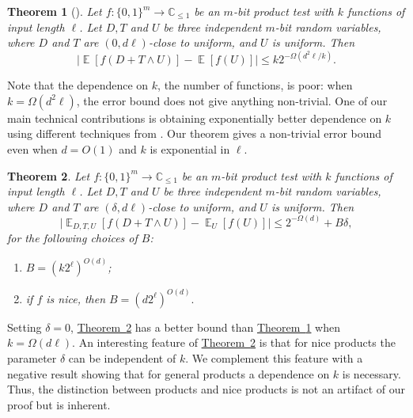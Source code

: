 \documentclass[11pt]{article}
\numberwithin{equation}{section}
\newtheorem{theorem}{Theorem}[section]
\theoremstyle{definition}
\theoremstyle{plain}
\newcommand{\C}{\mathbb C}
\newcommand{\expref}[2]{\hyperref[#2]{#1~\ref{#2}}}
\newcommand{\zo}{\{0,1\}}
\def\Blocklength{\ell}
\DeclareMathOperator*{\E}{\mathbb{E}}                 %
\begin{document}
%
\begin{theorem}[\cite{HaramatyLV-bipnfp}] \label{thm:HLV}
  Let $f\colon \zo^m \to \C_{\le 1}$ be an %
  $m$-bit %
  product test with $k$ functions
  of input length $\Blocklength$.
  Let $D,T$ and $U$ be three independent $m$-bit random variables, where
  $D$ and $T$ 
  are $(0,d\Blocklength)$-close to uniform, and $U$ is uniform.
Then
\[
	\bigl| \E[f(D + T \wedge U)] - \E[f(U)] \bigr|
        \le k 2^{-\Omega(d^2 \Blocklength/k)} .
\]
%
\end{theorem}
Note that the dependence on %
%
$k$, the number of functions,
is poor:
when $k = \Omega(d^2 \Blocklength)$, the error bound does not give
anything non-trivial.
%
One of our main technical contributions  %
is obtaining exponentially better
%
dependence    %
on $k$ using different techniques from \cite{HaramatyLV-bipnfp}.
Our theorem gives
a  %
non-trivial error bound even when $d = O(1)$ and $k$
is exponential in $\Blocklength$.

\begin{theorem} \label{t-bipn-prod-intro}
  Let $f\colon \zo^m \to \C_{\le 1}$ be an %
  $m$-bit %
  product test with $k$ functions of
  input length $\Blocklength$. 
  Let $D,T$ and $U$ be three independent $m$-bit random variables, where  %
  $D$ and $T$ are $(\delta, d\Blocklength)$-close to uniform,
  and $U$ is uniform.
  Then
   \[
     \bigl| \E_{D,T,U} [ f(D+T \wedge U) ] - \E_U[f(U)] \bigr| \le 2^{-\Omega(d)} + B \delta ,
   \]
  for the following choices of $B$:
  \begin{enumerate}[label=\roman*.,ref=\ref{t-bipn-prod-intro}.\roman*]
    \item \label{thm:bipnfp-general}
      $B = (k2^\Blocklength)^{O(d)}$;
    \item \label{thm:bipnfp-nice}
      if $f$ is nice, then $B = (d 2^\Blocklength)^{O(d)}.$
  \end{enumerate}
\end{theorem}

Setting $\delta = 0$, \expref{Theorem}{t-bipn-prod-intro} has a better bound than \expref{Theorem}{thm:HLV} when $k = \Omega(d\Blocklength)$.
An interesting feature of \expref{Theorem}{t-bipn-prod-intro} is that for nice
products the parameter $\delta$ can be independent of $k$.  We
complement this feature with a negative result showing that for general
products a dependence on $k$ is necessary.
Thus, the distinction between products and nice products is not an artifact of our proof but is
inherent.
\end{document}
